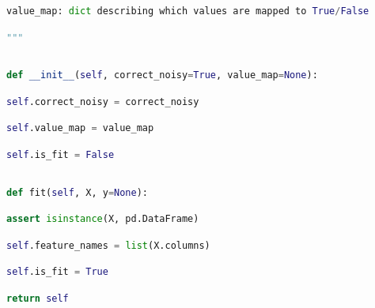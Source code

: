 \documentclass[
  11pt,
  a4paper,
  DIV=12,captions=tableheading,oneside]{scrbook}
\begin{document}
\begin{lstlisting}[language=Python,stepnumber=2,basicstyle=\footnotesize]
    value_map: dict describing which values are mapped to True/False\end{lstlisting}
\begin{lstlisting}[language=Python,stepnumber=2,basicstyle=\footnotesize]
    """\end{lstlisting}
\begin{lstlisting}[language=Python,stepnumber=2,basicstyle=\footnotesize]
\end{lstlisting}
\begin{lstlisting}[language=Python,stepnumber=2,basicstyle=\footnotesize]
    def __init__(self, correct_noisy=True, value_map=None):\end{lstlisting}
\begin{lstlisting}[language=Python,stepnumber=2,basicstyle=\footnotesize]
        self.correct_noisy = correct_noisy\end{lstlisting}
\begin{lstlisting}[language=Python,stepnumber=2,basicstyle=\footnotesize]
        self.value_map = value_map\end{lstlisting}
\begin{lstlisting}[language=Python,stepnumber=2,basicstyle=\footnotesize]
        self.is_fit = False\end{lstlisting}
\begin{lstlisting}[language=Python,stepnumber=2,basicstyle=\footnotesize]
\end{lstlisting}
\begin{lstlisting}[language=Python,stepnumber=2,basicstyle=\footnotesize]
    def fit(self, X, y=None):\end{lstlisting}
\begin{lstlisting}[language=Python,stepnumber=2,basicstyle=\footnotesize]
        assert isinstance(X, pd.DataFrame)\end{lstlisting}
\begin{lstlisting}[language=Python,stepnumber=2,basicstyle=\footnotesize]
        self.feature_names = list(X.columns)\end{lstlisting}
\begin{lstlisting}[language=Python,stepnumber=2,basicstyle=\footnotesize]
        self.is_fit = True\end{lstlisting}
\begin{lstlisting}[language=Python,stepnumber=2,basicstyle=\footnotesize]
        return self\end{lstlisting}
\end{document}
